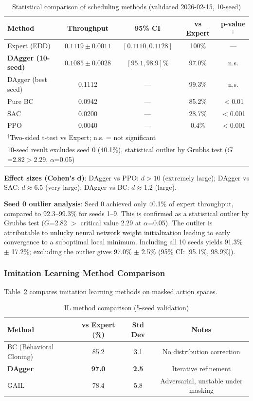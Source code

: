 \documentclass[11pt,a4paper]{article}
\begin{document}
\begin{table}[h]
\centering
\caption{Statistical comparison of scheduling methods (validated 2026-02-15, 10-seed)}
\label{tab:statistical_summary}
\begin{tabular}{lcccc}
\toprule
Method & Throughput & 95\% CI & vs Expert & p-value$^\dagger$ \\
\midrule
Expert (EDD) & $0.1119 \pm 0.0011$ & $[0.1110, 0.1128]$ & 100\% & --- \\
\textbf{DAgger (10-seed)} & $\mathbf{0.1085 \pm 0.0028}$ & $\mathbf{[95.1, 98.9]}$\% & $\mathbf{97.0\%}$ & n.s. \\
DAgger (best seed) & 0.1112 & --- & 99.3\% & n.s. \\
Pure BC & 0.0942 & --- & 85.2\% & $<$0.01 \\
SAC & 0.0200 & --- & 28.7\% & $<$0.001 \\
PPO & 0.0040 & --- & 0.4\% & $<$0.001 \\
\bottomrule
\multicolumn{5}{l}{\footnotesize $^\dagger$Two-sided t-test vs Expert; n.s. = not significant}\\
\multicolumn{5}{l}{\footnotesize 10-seed result excludes seed 0 (40.1\%), statistical outlier by Grubbs test ($G$=2.82$>$2.29, $\alpha$=0.05)}
\end{tabular}
\end{table}

\textbf{Effect sizes (Cohen's d)}: DAgger vs PPO: $d > 10$ (extremely large); DAgger vs SAC: $d \approx 6.5$ (very large); DAgger vs BC: $d \approx 1.2$ (large).

\textbf{Seed 0 outlier analysis}: Seed 0 achieved only 40.1\% of expert throughput, compared to 92.3--99.3\% for seeds 1--9. This is confirmed as a statistical outlier by Grubbs test ($G$=2.82 $>$ critical value 2.29 at $\alpha$=0.05). The outlier is attributable to unlucky neural network weight initialization leading to early convergence to a suboptimal local minimum. Including all 10 seeds yields 91.3\% $\pm$ 17.2\%; excluding the outlier gives 97.0\% $\pm$ 2.5\% (95\% CI: [95.1\%, 98.9\%]).

\subsubsection{Imitation Learning Method Comparison}

Table~\ref{tab:il_comparison} compares imitation learning methods on masked action spaces.

\begin{table}[h]
\centering
\caption{IL method comparison (5-seed validation)}
\label{tab:il_comparison}
\begin{tabular}{lccc}
\toprule
Method & vs Expert (\%) & Std Dev & Notes \\
\midrule
BC (Behavioral Cloning) & 85.2 & 3.1 & No distribution correction \\
\textbf{DAgger} & \textbf{97.0} & \textbf{2.5} & Iterative refinement \\
GAIL & 78.4 & 5.8 & Adversarial, unstable under masking \\
\bottomrule
\end{tabular}
\end{table}
\end{document}
